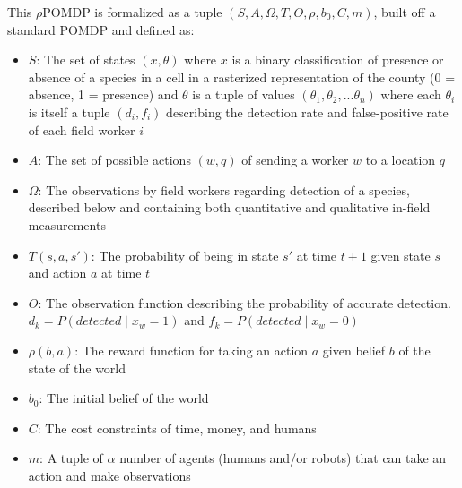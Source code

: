 \documentclass{article}
\begin{document}
This $\rho$POMDP is formalized as a tuple $(S, A, \Omega, T, O, \rho, b_0, C, m)$, built off a standard POMDP \cite{POMDP-formulation} and defined as:
\begin{itemize}
    \item $S$: The set of states $(x, \theta)$ where $x$ is a binary classification of presence or absence of a species in a cell in a rasterized representation of the county (0 = absence, 1 = presence) and $\theta$ is a tuple of values $(\theta_1, \theta_2, ... \theta_n)$ where each $\theta_i$ is itself a tuple $(d_i, f_i)$ describing the detection rate and false-positive rate of each field worker $i$

    \item $A$: The set of possible actions $(w, q)$ of sending a worker $w$ to a location $q$

    \item $\Omega$: The observations by field workers regarding detection of a species, described below and containing both quantitative and qualitative in-field measurements

    \item $T(s, a, s')$: The probability of being in state $s'$ at time $t+1$ given state $s$ and action $a$ at time $t$

    \item $O$: The observation function describing the probability of accurate detection. $d_k = P(detected \; | \; x_w = 1)$ and $f_k = P(detected \; | \; x_w = 0)$

    \item $\rho(b, a)$: The reward function for taking an action $a$ given belief $b$ of the state of the world

    \item $b_0$: The initial belief of the world

    \item $C$: The cost constraints of time, money, and humans

    \item $m$: A tuple of $\alpha$ number of agents (humans and/or robots) that can take an action and make observations
\end{itemize}
\end{document}

